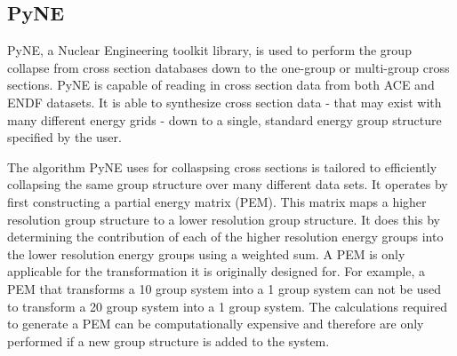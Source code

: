 \documentclass{article}
\begin{document}
\subsection{PyNE}
PyNE, a Nuclear Engineering toolkit library, is used to perform the group collapse
from cross section databases down to the one-group or multi-group cross sections.
PyNE is capable of reading in cross section data from both ACE\cite{ace} and ENDF\cite{endf}
datasets. It is able to synthesize cross section data - that may exist with
many different energy grids - down to a single, standard energy group structure specified
by the user.

The algorithm PyNE uses for collaspsing cross sections is tailored to efficiently collapsing
the same group structure over many different data sets.
It operates by first constructing a partial energy matrix (PEM). This matrix maps a higher
resolution group structure to a lower resolution group structure. It does this by determining
the contribution of each of the higher resolution energy groups into the lower resolution
energy groups using a weighted sum. A PEM is only applicable for the transformation it is
originally designed for. For example, a PEM that transforms a 10 group system into a
1 group system can not be used to transform a 20 group system into a 1 group system.
The calculations required to generate a PEM can be computationally expensive
and therefore are only performed if a new group structure is added to the system.
\end{document}
